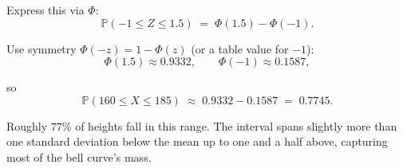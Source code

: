 \documentclass{book}
\begin{document}
Express this via $\Phi$:
\begin{equation}
	\mathbb{P}(-1 \le Z \le 1.5) \;=\; \Phi(1.5) - \Phi(-1).
\end{equation}

Use symmetry $\Phi(-z)=1-\Phi(z)$ (or a table value for $-1$):
\begin{equation}
	\Phi(1.5) \approx 0.9332, \qquad \Phi(-1) \approx 0.1587,
\end{equation}

so
\begin{equation}
	\mathbb{P}(160 \le X \le 185) \;\approx\; 0.9332 - 0.1587 \;=\; 0.7745.
\end{equation}

Roughly $77\%$ of heights fall in this range. The interval spans slightly more than one standard deviation below the mean up to one and a half above, capturing most of the bell curve’s mass.
\end{document}
